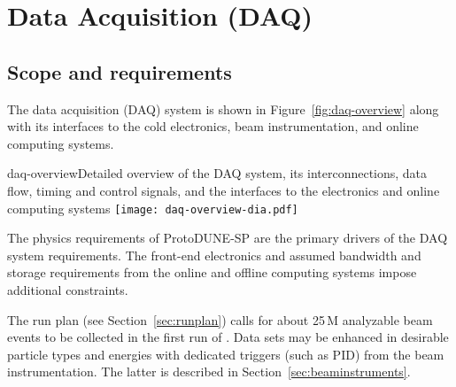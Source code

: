 \section{Data Acquisition (DAQ)} 
\label{sec:daq}

\subsection{Scope and requirements}

The data acquisition (DAQ) system is shown in Figure~\ref{fig:daq-overview} along with its
interfaces to the cold electronics, beam instrumentation, and online
computing systems.

\begin{cdrfigure}{daq-overview}{Detailed overview of the
DAQ system, its interconnections, data flow, timing and control signals,
and the interfaces to the electronics and online computing systems}
        \texttt{[image: daq-overview-dia.pdf]}
\end{cdrfigure}

 
The physics requirements of  ProtoDUNE-SP are the primary drivers of the
DAQ system requirements.
The front-end electronics and assumed bandwidth and storage requirements
from the online and offline computing systems impose additional constraints.  

The run plan (see Section~\ref{sec:runplan}) calls for about 25\,M analyzable beam events
to be collected in the first run of \pdsp. Data sets may be enhanced  in desirable particle types and energies
with dedicated triggers (such as PID)  from the beam instrumentation. The latter is described in Section~\ref{sec:beaminstruments}.

